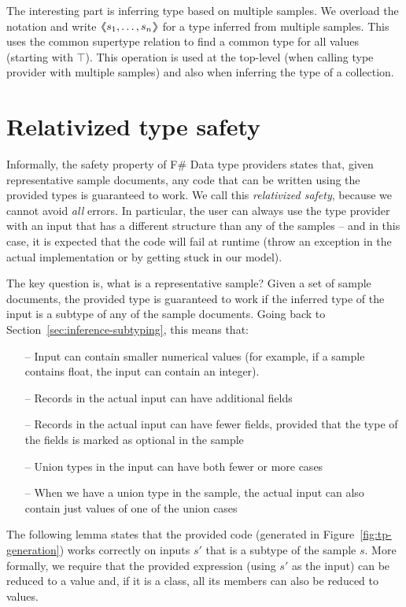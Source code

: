 \documentclass[preprint]{sigplanconf}
\newcommand{\langl}{\begin{picture}(4.5,7)
\put(1.1,2.5){\rotatebox{60}{\line(1,0){5.5}}}
\put(1.1,2.5){\rotatebox{300}{\line(1,0){5.5}}}
\end{picture}}
\newcommand{\rangl}{\begin{picture}(4.5,7)
\put(.9,2.5){\rotatebox{120}{\line(1,0){5.5}}}
\put(.9,2.5){\rotatebox{240}{\line(1,0){5.5}}}
\end{picture}}
\newcommand{\llangl}{\langl\hspace{-0.35em}\langl}
\newcommand{\rrangl}{\rangl\hspace{-0.35em}\rangl}
\newcommand{\semalt}[1]{\llangl #1 \rrangl}
\begin{document}
The interesting part is inferring type based on multiple samples. We overload
the notation and write $\semalt{s_1, \ldots, s_n}$ for a type inferred from multiple samples.
This uses the common supertype relation to find a common type for all values (starting with $\top$).
This operation is used at the top-level (when calling type provider with multiple samples)
and also when inferring the type of a collection.


\section{Relativized type safety}
\label{sec:safety}

Informally, the safety property of F\# Data type providers states that, given representative sample
documents, any code that can be written using the provided types is guaranteed to work. We call this 
\emph{relativized safety}, because we cannot avoid \emph{all} errors. In particular, the user can 
always use the type provider with an input that has a different structure than any of the samples -- and in 
this case, it is expected that the code will fail at runtime (throw an exception in the actual 
implementation or by getting stuck in our model).

The key question is, what is a representative sample? Given a set of sample documents, 
the provided type is guaranteed to work if the inferred type of the input is a subtype of any of the
sample documents. Going back to Section~\ref{sec:inference-subtyping}, this means that:
%
\begin{itemize}[noitemsep]
\item[--] Input can contain smaller numerical values (for example, if a sample contains float, the input can contain an integer).
\item[--] Records in the actual input can have additional fields
\item[--] Records in the actual input can have fewer fields, provided that the type of the fields is marked as optional in the sample
\item[--] Union types in the input can have both fewer or more cases
\item[--] When we have a union type in the sample, the actual input can also contain just values of one of the union cases
\end{itemize}
%
The following lemma states that the provided code (generated in Figure~\ref{fig:tp-generation})
works correctly on inputs $s'$ that is a subtype of the sample $s$. More formally, we require that the 
provided expression (using $s'$ as the input) can be reduced to a value and, if it is a class,
all its members can also be reduced to values.
\end{document}
